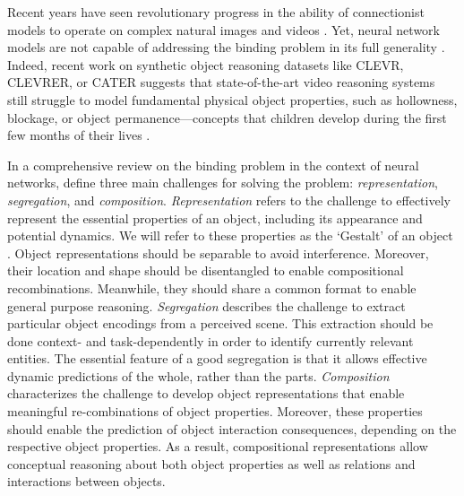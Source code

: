 \documentclass{article} \usepackage{iclr2023_conference_arxiv,times}
\begin{document}
Recent years have seen revolutionary progress in the ability of connectionist models to operate on complex natural images and videos \citep{Gatys:2016,Krizhevsky:2012,Meinhardt:2022}.
Yet, neural network models are not capable of addressing the binding problem in its full generality \citep{greff2020binding}. Indeed, recent work on synthetic object reasoning datasets like CLEVR, CLEVRER, or CATER \cite{girdhar2019CATER,johnson2017clevr,yi2019clevrer} suggests that state-of-the-art video reasoning systems \cite{carreira2017quo,wang2018non,yang2020temporal} still struggle to model fundamental physical object properties, such as hollowness, blockage, or object permanence---concepts that children develop during the first few months of their lives \cite{Baillargeon:1985,Mandler:2004}.

In a comprehensive review on the binding problem in the context of neural networks, \citet{greff2020binding} define three main challenges for solving the problem: \emph{representation}, \emph{segregation}, and \emph{composition}.
\emph{Representation} refers to the challenge to effectively represent the essential properties of an object, including its appearance and potential dynamics. We will refer to these properties as the `Gestalt' of an object \citep{Koffka:2013,Wagemans2012ACO1, Wagemans2012ACO2}.
Object representations should be separable to avoid interference.
Moreover, their location and shape should be disentangled to enable compositional recombinations.
Meanwhile, they should share a common format to enable general purpose reasoning. 
\emph{Segregation} describes the challenge to extract particular object encodings from a perceived scene. 
This extraction should be done context- and task-dependently in order to identify currently relevant entities. 
The essential feature of a good segregation is that it allows effective dynamic predictions of the whole, rather than the parts.
\emph{Composition} characterizes the challenge to develop object representations that enable meaningful re-combinations of object properties.
Moreover, these properties should enable the prediction of object interaction consequences, depending on the respective object properties. 
As a result, compositional representations allow conceptual reasoning about both object properties as well as relations and interactions between objects. 
\end{document}
